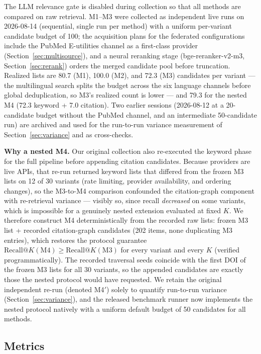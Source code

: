 \documentclass[nonacm,sigconf]{acmart}
\begin{document}
The LLM relevance gate is disabled during collection so that all methods
are compared on raw retrieval. M1--M3 were collected as independent live
runs on 2026-08-14 (sequential, single run per method) with a uniform
per-variant candidate budget of 100; the acquisition plans for the
federated configurations include the PubMed E-utilities channel as a
first-class provider (Section~\ref{sec:multisource}), and a neural
reranking stage (bge-reranker-v2-m3, Section~\ref{sec:rerank}) orders the
merged candidate pool before truncation. Realized lists are 80.7 (M1),
100.0 (M2), and 72.3 (M3) candidates per variant --- the multilingual
search splits the budget across the six language channels before global
deduplication, so M3's realized count is lower --- and 79.3 for the nested
M4 (72.3 keyword + 7.0 citation). Two earlier sessions (2026-08-12 at a
20-candidate budget without the PubMed channel, and an intermediate
50-candidate run) are archived and used for the run-to-run variance
measurement of Section~\ref{sec:variance} and as cross-checks.

\textbf{Why a nested M4.} Our original collection also re-executed the
keyword phase for the full pipeline before appending citation candidates.
Because providers are live APIs, that re-run returned keyword lists that
differed from the frozen M3 lists on 12 of 30 variants (rate limiting,
provider availability, and ordering changes), so the M3-to-M4 comparison
confounded the citation-graph component with re-retrieval variance ---
visibly so, since recall \emph{decreased} on some variants, which is
impossible for a genuinely nested extension evaluated at fixed $K$. We
therefore construct M4 deterministically from the recorded raw lists:
frozen M3 list + recorded citation-graph candidates (202 items, none
duplicating M3 entries), which restores the protocol guarantee
$\text{Recall@}K(\text{M4}) \ge \text{Recall@}K(\text{M3})$ for every
variant and every $K$ (verified programmatically). The recorded traversal
seeds coincide with the first DOI of the frozen M3 lists for all 30
variants, so the appended candidates are exactly those the nested protocol
would have requested. We retain the original independent re-run (denoted
M4$'$) solely to quantify run-to-run variance
(Section~\ref{sec:variance}), and the released benchmark runner now
implements the nested protocol natively with a uniform default budget of
50 candidates for all methods.

\subsection{Metrics}
\label{sec:metrics}
\end{document}

